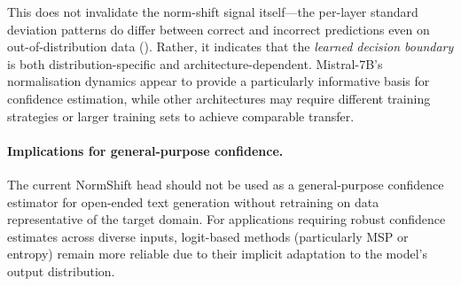 \documentclass[11pt,a4paper]{article}
\begin{document}
This does not invalidate the norm-shift signal itself---the per-layer
standard deviation patterns do differ between correct and incorrect
predictions even on out-of-distribution data ().
Rather, it indicates that the \emph{learned decision boundary} is both
distribution-specific and architecture-dependent.  Mistral-7B's
normalisation dynamics appear to provide a particularly informative
basis for confidence estimation, while other architectures may require
different training strategies or larger training sets to achieve
comparable transfer.

\paragraph{Implications for general-purpose confidence.}
The current NormShift head should not be used as a general-purpose
confidence estimator for open-ended text generation without retraining on
data representative of the target domain.  For applications requiring
robust confidence estimates across diverse inputs, logit-based methods
(particularly MSP or entropy) remain more reliable due to their implicit
adaptation to the model's output distribution.




\end{document}
